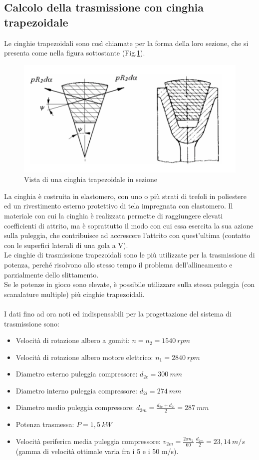 \subsection{Calcolo della trasmissione con cinghia trapezoidale}
Le cinghie trapezoidali sono così chiamate per la forma della loro sezione, che si presenta come nella figura sottostante (Fig.\ref{fig:CinghiaTrapezoidale}).
\newpage
\begin{figure}[h]
    \centering
    \includegraphics[scale=0.4]{Immagini/CinghiaTrapezoidale.png}
    \caption{Vista di una cinghia trapezoidale in sezione}
    \label{fig:CinghiaTrapezoidale}
\end{figure}
La cinghia è costruita in elastomero, con uno o più strati di trefoli in poliestere ed un rivestimento esterno protettivo di tela impregnata con elastomero. Il materiale con cui la cinghia è realizzata permette di raggiungere elevati coefficienti di attrito, ma è soprattutto il modo con  cui essa esercita la sua azione sulla puleggia, che contribuisce ad accrescere l’attrito con quest’ultima (contatto con le superfici laterali di una gola a V).\\
Le cinghie di trasmissione trapezoidali sono le più utilizzate per la trasmissione di potenza, perché risolvono allo stesso tempo il problema dell’allineamento e parzialmente dello slittamento. \\
Se le potenze in gioco sono elevate, è possibile utilizzare sulla stessa puleggia (con scanalature multiple) più cinghie trapezoidali.\\
\\
I dati fino ad ora noti ed indispensabili per la progettazione del sistema di trasmissione sono: 
\begin{itemize}
    \item Velocità di rotazione albero a gomiti: $n = n_2 = 1540\ rpm$ 
    \item Velocità di rotazione albero motore elettrico: $n_1 = 2840\ rpm$
    \item Diametro esterno puleggia compressore: $d_{2e} = 300\ mm$
    \item Diametro interno puleggia compressore: $d_{2i} = 274\ mm$
    \item Diametro medio puleggia compressore: $d_{2m}=\frac{d_{2e}+d_{2i}}{2}=287\ mm$
    \item Potenza trasmessa: $P = 1,5\ kW$
    \item Velocità periferica media puleggia compressore: $v_{2m}=\frac{2\pi n_2}{60}\ \frac{d_{2m}}{2}=23,14\ m/s$ (gamma di velocità ottimale varia fra i 5 e i 50 m/s).
\end{itemize}
